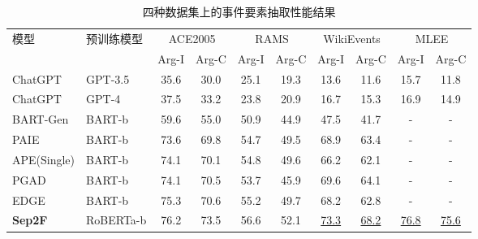 \begin{table*}[htp]
\centering
\small
\caption{四种数据集上的事件要素抽取性能结果}
\begin{tabular}{llcccccccc}
\toprule
\multicolumn{1}{l}{\multirow{2}{*}{模型}} & \multicolumn{1}{l}{\multirow{2}{*}{预训练模型}} & \multicolumn{2}{c}{ACE2005} & \multicolumn{2}{c}{RAMS} & \multicolumn{2}{c}{WikiEvents} & \multicolumn{2}{c}{MLEE} \\ \cmidrule(lr){3-4} \cmidrule(lr){5-6} \cmidrule(lr){7-8} \cmidrule(lr){9-10}
\multicolumn{1}{l}{}                       & \multicolumn{1}{l}{}                     & Arg-I        & Arg-C        & Arg-I       & Arg-C      & Arg-I          & Arg-C         & Arg-I       & Arg-C      \\ \midrule
\multicolumn{1}{l}{ChatGPT}   & \multicolumn{1}{l}{GPT-3.5} & 35.6 & 30.0 & 25.1 & 19.3 & 13.6 & 11.6 &  15.7 & 11.8  \\
\multicolumn{1}{l}{ChatGPT}   & \multicolumn{1}{l}{GPT-4}  & 37.5 & 33.2 & 23.8 & 20.9 & 16.7 & 15.3 & 16.9 & 14.9 \\ \midrule
\multicolumn{1}{l}{BART-Gen}  & \multicolumn{1}{l}{BART-b} & 59.6 & 55.0 & 50.9 & 44.9 & 47.5 & 41.7 & - & - \\
\multicolumn{1}{l}{PAIE}  & \multicolumn{1}{l}{BART-b} 
& 73.6 & 69.8 & 54.7 & 49.5 & 68.9 & 63.4 & - & - \\
\multicolumn{1}{l}{APE(Single)}  & \multicolumn{1}{l}{BART-b} & 74.1 & 70.1 & 54.8 & 49.6 & 66.2 & 62.1 & - & - \\
\multicolumn{1}{l}{PGAD}  & \multicolumn{1}{l}{BART-b} & 74.1 & 70.5 & 53.7 & 45.9 & 69.6 & 64.1 & - & - \\
\multicolumn{1}{l}{EDGE}  & \multicolumn{1}{l}{BART-b} & 75.3 & 70.6 & 55.2 & 49.7 & 68.2 & 62.8 & - & - \\ 
\multicolumn{1}{l}{\textbf{Sep2F}}   & \multicolumn{1}{l}{RoBERTa-b}  & 76.2 & 73.5 & 56.6 & 52.1 & \underline{73.3} & \underline{68.2} & \underline{76.8} & \underline{75.6} \\ \midrule


\end{tabular}
\end{table*}
